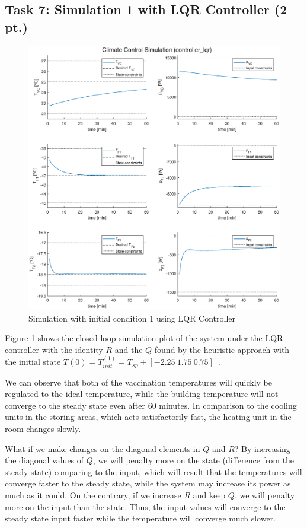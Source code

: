 \documentclass[a4paper,twoside,11pt]{article}
\numberwithin{equation}{section}
\begin{document}
\subsection{Task 7: Simulation 1 with LQR Controller (2 pt.)}

\begin{figure}[ht]
\centering
\includegraphics[scale = 0.58]{image/7.eps}
\caption{Simulation with initial condition 1 using LQR Controller}
\label{fig:3}
\end{figure}

Figure \ref{fig:3} shows the closed-loop simulation plot of the system under the LQR controller with the identity $R$ and the $Q$ found by the heuristic approach with the initial state $T(0) = T^{(1)}_{init} = T_{sp} + [-2.25 \ 1.75 \ 0.75]^\top$. 

We can observe that both of the vaccination temperatures will quickly be regulated to the ideal temperature, while the building temperature will not converge to the steady state even after 60 minutes. In comparison to the cooling units in the storing areas, which acts satisfactorily fast, the heating unit in the room changes slowly. 

What if we make changes on the diagonal elements in $Q$ and $R$? By increasing the diagonal values of $Q$, we will penalty more on the state (difference from the steady state) comparing to the input, which will result that the temperatures will converge faster to the steady state, while the system may increase its power as much as it could. On the contrary, if we increase $R$ and keep $Q$, we will penalty more on the input than the state. Thus, the input values will converge to the steady state input faster while the temperature will converge much slower.
\end{document}
